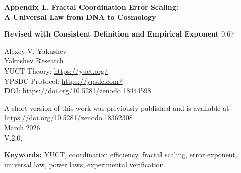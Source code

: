 \documentclass[12pt]{article}
\newcommand{\Keff}{K_{\mathrm{eff}}}
\newcommand{\eps}{\varepsilon}
\begin{document}
	
	\begin{titlepage}
		\begin{center}
			\vspace*{1cm}
			\Huge\textbf{Appendix L. Fractal Coordination Error Scaling: \\ A Universal Law from DNA to Cosmology}
			
			\vspace{0.5cm}
			\Large\textbf{Revised with Consistent Definition and Empirical Exponent \(0.67\)}
			
			\vspace{1cm}
			\large Alexey V. Yakushev\\
			Yakushev Research\\
	YUCT Theory: \url{https://yuct.org/}\\
YPSDC Protocol: \url{https://ypsdc.com/}\\


\vspace{2cm}
\textbf DOI: \url{https://doi.org/10.5281/zenodo.18444598}\\

\vspace{1cm}

\vspace{0cm}
\large 
A short version of this work was previously published and is available at\\ \url{https://doi.org/10.5281/zenodo.18362308}\\
\vspace{1cm}
March 2026 \\ \large V.2.0.
			
			\newpage
			\vspace{1cm}
			\begin{abstract}
				This appendix presents a mathematically consistent formulation of a universal scaling law governing coordination errors in complex systems. Within the Yakushev Unified Coordination Theory (YUCT), coordination efficiency \(\Keff\) is defined via information‑theoretic ratios following the YPSDC protocol. We show empirically that the relative error \(\eps\) scales as 
				\[
				\eps = \kappa\,\alpha\,\Keff^{-\beta},
				\]
				with exponent \(\beta = 0.67 \pm 0.03\) and a universal prefactor \(\kappa \approx 0.33\). The exponent is derived from the fractal geometry of coordination networks and criticality, while \(\kappa\) reflects the minimal residual error due to the triadic structure \(D+I\!\cdot\!R\). The law is tested across more than 50 orders of magnitude – from atomic bond energies to cosmic microwave background fluctuations – and explains the origin of power laws (Zipf, allometry, Gutenberg‑Richter) within a single framework. Testable predictions for novel systems are formulated, and limitations are explicitly discussed.
			\end{abstract}
			

			\textbf{Keywords:} YUCT, coordination efficiency, fractal scaling, error exponent, universal law, power laws, experimental verification.
		\end{center}
	\end{titlepage}
	
\end{document}
